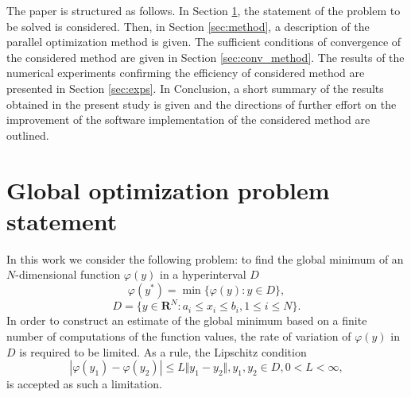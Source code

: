 \documentclass[runningheads]{llncs}
\begin{document}
The paper is structured as follows. In Section \ref{sec:problem}, the statement of the problem to
be solved is considered. Then, in Section \ref{sec:method}, a description of the parallel
optimization method is given. The sufficient conditions of convergence of the considered
method are given in Section \ref{sec:conv_method}.
The results of the numerical experiments confirming the efficiency of considered method are
presented in Section \ref{sec:exps}.
In Conclusion, a short summary of the results obtained in the present study is given and the
directions of further effort on the improvement of the software implementation of the
considered method are outlined.


\section{Global optimization problem statement}
\label{sec:problem}
In this work we consider the following
problem: to find the global minimum of an \(N\)-dimensional function \(\varphi(y)\) in
a hyperinterval $D$
\begin{equation}
\label{eq:task}
\varphi(y^*)=\min\{\varphi(y):y\in D\},
\end{equation}
\begin{displaymath}
D=\{y\in \mathbf{R}^N:a_i\leqslant x_i\leqslant{b_i}, 1\leqslant{i}\leqslant{N}\}.
\end{displaymath}
In order to construct an estimate of the global minimum based on a finite number of
computations of the function values, the rate of variation of \(\varphi(y)\) in \(D\) is required to
be limited.
As a rule, the Lipschitz condition
\begin{displaymath}
\label{lip}
|\varphi(y_1)-\varphi(y_2)|\leqslant L\Vert y_1-y_2\Vert,y_1,y_2\in D,0<L<\infty,
\end{displaymath}
is accepted as such a limitation.
\end{document}
